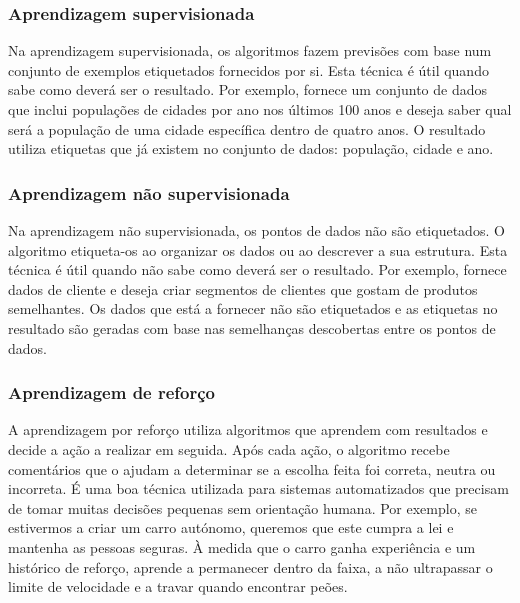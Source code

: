 \documentclass[a4paper,10pt]{article}
\begin{document}
\subsubsection{Aprendizagem supervisionada}

Na aprendizagem supervisionada, os algoritmos fazem previsões com base num conjunto de exemplos etiquetados fornecidos por si. 
Esta técnica é útil quando sabe como deverá ser o resultado. 
Por exemplo, fornece um conjunto de dados que inclui populações de cidades por ano nos últimos 100 anos e deseja saber qual será a população de uma cidade específica dentro de quatro anos. 
O resultado utiliza etiquetas que já existem no conjunto de dados: população, cidade e ano.

\subsubsection{Aprendizagem não supervisionada}

Na aprendizagem não supervisionada, os pontos de dados não são etiquetados. 
O algoritmo etiqueta-os ao organizar os dados ou ao descrever a sua estrutura. 
Esta técnica é útil quando não sabe como deverá ser o resultado. 
Por exemplo, fornece dados de cliente e deseja criar segmentos de clientes que gostam de produtos semelhantes. 
Os dados que está a fornecer não são etiquetados e as etiquetas no resultado são geradas com base nas semelhanças descobertas entre os pontos de dados.

\subsubsection{Aprendizagem de reforço}

A aprendizagem por reforço utiliza algoritmos que aprendem com resultados e decide a ação a realizar em seguida. 
Após cada ação, o algoritmo recebe comentários que o ajudam a determinar se a escolha feita foi correta, neutra ou incorreta. 
É uma boa técnica utilizada para sistemas automatizados que precisam de tomar muitas decisões pequenas sem orientação humana. 
Por exemplo, se estivermos a criar um carro autónomo, queremos que este cumpra a lei e mantenha as pessoas seguras. 
À medida que o carro ganha experiência e um histórico de reforço, aprende a permanecer dentro da faixa, a não ultrapassar o limite de velocidade e a travar quando encontrar peões.
\end{document}
